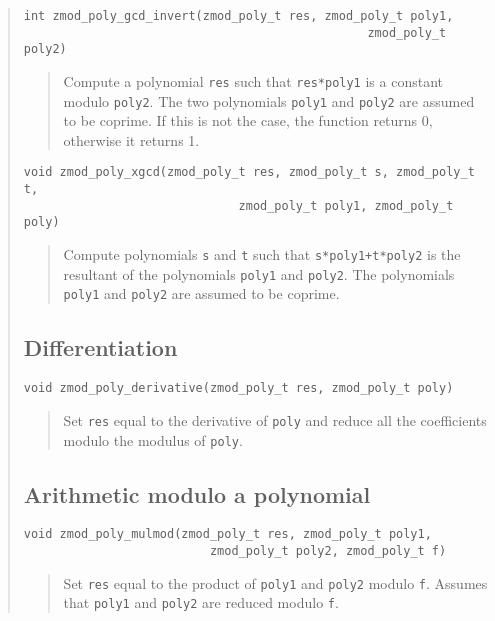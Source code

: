 \documentclass[a4paper,10pt]{article}
\newcommand{\code}{\lstinline}
\begin{document}
\begin{quote}
\begin{lstlisting}
int zmod_poly_gcd_invert(zmod_poly_t res, zmod_poly_t poly1, 
                                                zmod_poly_t poly2)
\end{lstlisting}
\begin{quote}
Compute a polynomial \code{res} such that \code{res*poly1} is a constant modulo \code{poly2}. The two polynomials \code{poly1} and \code{poly2} are assumed to be coprime. If this is not the case, the function returns 0, otherwise it returns 1.
\end{quote}

\begin{lstlisting}
void zmod_poly_xgcd(zmod_poly_t res, zmod_poly_t s, zmod_poly_t t,  
                              zmod_poly_t poly1, zmod_poly_t poly)
\end{lstlisting}
\begin{quote}
Compute polynomials \code{s} and \code{t} such that \code{s*poly1+t*poly2} is the resultant of the polynomials \code{poly1} and \code{poly2}. The polynomials \code{poly1} and \code{poly2} are assumed to be coprime.
\end{quote}

\subsection{Differentiation}
\begin{lstlisting}
void zmod_poly_derivative(zmod_poly_t res, zmod_poly_t poly)
\end{lstlisting}
\begin{quote}
Set \code{res} equal to the derivative of \code{poly} and reduce all the coefficients modulo the modulus of \code{poly}.
\end{quote}

\subsection{Arithmetic modulo a polynomial}

\begin{lstlisting}
void zmod_poly_mulmod(zmod_poly_t res, zmod_poly_t poly1,
                          zmod_poly_t poly2, zmod_poly_t f)
\end{lstlisting}
\begin{quote}
Set \code{res} equal to the product of \code{poly1} and \code{poly2} modulo \code{f}.  Assumes that \code{poly1} and \code{poly2} are reduced modulo \code{f}. 
\end{quote}


\end{quote}
\end{document}
